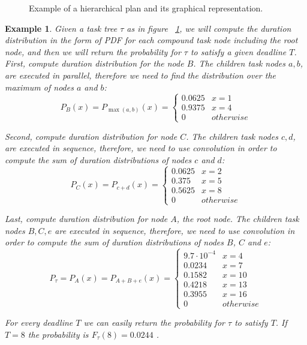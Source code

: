 \documentclass{article}
\newtheorem{example}{Example}
\begin{document}
\begin{figure}
	\centering
	\caption{Example of a hierarchical plan and its graphical representation.}
	\label{fig:hierarchical plan}
\end{figure}


\begin{example}

Given a task tree $\tau$ as in figure ~\ref{fig:hierarchical plan}, we will compute the duration distribution in the form of PDF for each compound task node including the root node, and then we will return the probability for $\tau$ to satisfy a given deadline $T$. 
First, compute duration distribution for the node $B$. The children task nodes $a,b$, are executed in parallel, therefore we need to find the distribution over the maximum of nodes $a$ and $b$:  
$$P_B(x)=P_{\max(a,b)}(x)=
\begin{cases}
0.0625 & x=1 \\
0.9375 & x=4 \\
0 & otherwise
\end{cases}$$

Second, compute duration distribution for node $C$. The children task nodes $c,d$, are executed in sequence, therefore, we need to use convolution in order to compute the sum of duration distributions of nodes $c$ and $d$:  
$$P_C(x)=P_{c+d}(x)=
\begin{cases}
0.0625 & x=2 \\
0.375 & x=5 \\
0.5625 & x=8 \\
0 & otherwise
\end{cases}$$

Last, compute duration distribution for node $A$, the root node. The children task nodes $B,C,e$ are executed in sequence, therefore, we need to use convolution in order to compute the sum of duration distributions of nodes $B$, $C$ and $e$: 
$$P_{\tau}=P_A(x)=P_{A+B+e}(x)=
\begin{cases}
9.7\cdot 10^{-4} & x=4 \\
0.0234 & x=7 \\
0.1582 & x=10 \\
0.4218 & x=13 \\
0.3955 & x=16 \\
0 & otherwise
\end{cases}$$

For every deadline $T$ we can easily return the probability for $\tau$ to satisfy $T$. If $T=8$ the probability is  $F_{\tau}(8)=0.0244$ . 
\end{example}
\end{document}
